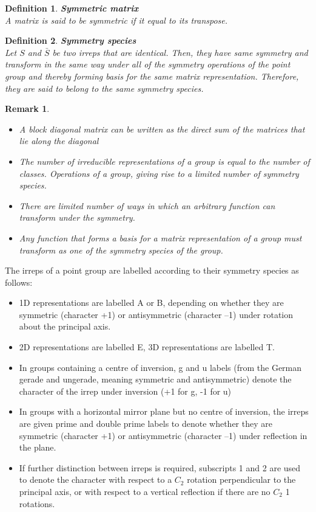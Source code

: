 \documentclass[a4paper, 12pt, openany]{report}
\newtheorem{rmk}{Remark}[section]
\newtheorem{defn}{Definition}[section]
\begin{document}
\begin{defn}\textbf{Symmetric matrix}\\
	A matrix is said to be symmetric if it equal to its transpose.\end{defn}
\begin{defn}\textbf{Symmetry species}\\
	Let $S$ and $\bar{S}$ be two irreps that are identical. Then, they have same symmetry and transform in the same way under all of the symmetry operations of the point group and thereby forming basis for the same matrix representation. Therefore, they are said to belong to the same symmetry species. 
\end{defn}
\begin{rmk}\begin{itemize}
		\item[1.]
		A block diagonal matrix can be written as the direct sum of the matrices that lie along the diagonal
		
		\item [2.]  The number of irreducible representations of a group is equal to the \break number of classes. Operations of a group, giving rise to a limited \break number of symmetry species.
		\item[3.] There are limited number of ways in which an arbitrary function can \linebreak transform under the symmetry. 
		\item[4.] Any function that forms a basis for a
		matrix representation of a group must transform as one of the symmetry species of the group.\end{itemize}
\end{rmk}

The irreps of a point group are labelled according to their symmetry species as follows:
\begin{itemize}
\item[(i)] 1D representations are labelled A or B, depending on whether they are \linebreak symmetric (character +1) or antisymmetric (character –1) under \break rotation about the principal axis.
\item[(ii)]  2D representations are labelled E, 3D representations are labelled T.
\item[(ii)]  In groups containing a centre of inversion, g and u labels (from the German gerade and ungerade, meaning
symmetric and antisymmetric) denote the character of the irrep under inversion (+1 for g, -1 for u)
\item[(iv)]  In groups with a horizontal mirror plane but no centre of inversion, the irreps are given prime and double
prime labels to denote whether they are symmetric (character +1) or antisymmetric (character –1) under
reflection in the plane.
\item[(v)]  If further distinction between irreps is required, subscripts 1 and 2 are used to denote the character with
respect to a $C_2$ rotation perpendicular to the principal axis, or with respect to a vertical reflection if there
are no $C_2$ 1 rotations.\end{itemize}
\end{document}
